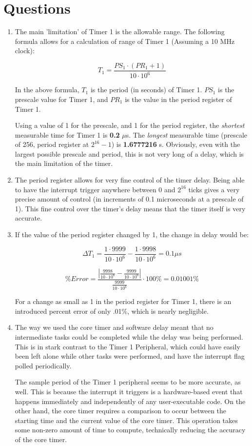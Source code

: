 \documentclass[a4paper, 12pt]{article}
\begin{document}
\section{Questions}
\begin{enumerate}
\item The main 'limitation' of Timer 1 is the allowable range. The following formula allows for a calculation of range of Timer 1 (Assuming a 10 MHz clock): 

$$T_1=\frac{PS_1 \cdot (PR_1+1)}{10\cdot 10^6}$$

In the above formula, $T_1$ is the period (in seconds) of Timer 1. $PS_1$ is the prescale value for Timer 1, and $PR_1$ is the value in the period register of Timer 1.

Using a value of 1 for the prescale, and 1 for the period register, the \textit{shortest} measurable time for Timer 1 is \textbf{0.2} $\mu$s. The \textit{longest} measurable time (prescale of 256, period register at $2^{16}-1$) is \textbf{1.6777216} s. Obviously, even with the largest possible prescale and period, this is not very long of a delay, which is the main limitation of the timer. 

\item The period register allows for very fine control of the timer delay. Being able to have the interrupt trigger anywhere between 0 and $2^{16}$ ticks gives a very precise amount of control (in increments of 0.1 microseconds at a prescale of 1). This fine control over the timer's delay means that the timer itself is very accurate.

\item If the value of the period register changed by 1, the change in delay would be:

$$\Delta T_1 = \frac{1 \cdot 9999}{10\cdot 10^6} - \frac{1 \cdot 9998}{10\cdot 10^6} = 0.1 \mu s$$

$$\% Error = \frac{|\frac{9998}{10 \cdot 10^6}-\frac{9999}{10 \cdot 10^6}|}{\frac{9999}{10 \cdot 10^6}} \cdot 100\% = 0.01001\%$$

For a change as small as 1 in the period register for Timer 1, there is an introduced percent error of only .01\%, which is nearly negligible. 

\item The way we used the core timer and software delay meant that no intermediate tasks could be completed while the delay was being performed. This is in stark contrast to the Timer 1 Peripheral, which could have easily been left alone while other tasks were performed, and have the interrupt flag polled periodically.

The sample period of the Timer 1 peripheral seems to be more accurate, as well. This is because the interrupt it triggers is a hardware-based event that happens immediately and independently of any user-executable code. On the other hand, the core timer requires a comparison to occur between the starting time and the current value of the core timer. This operation takes some non-zero amount of time to compute, technically reducing the accuracy of the core timer. 
\end{enumerate}
\end{document}

